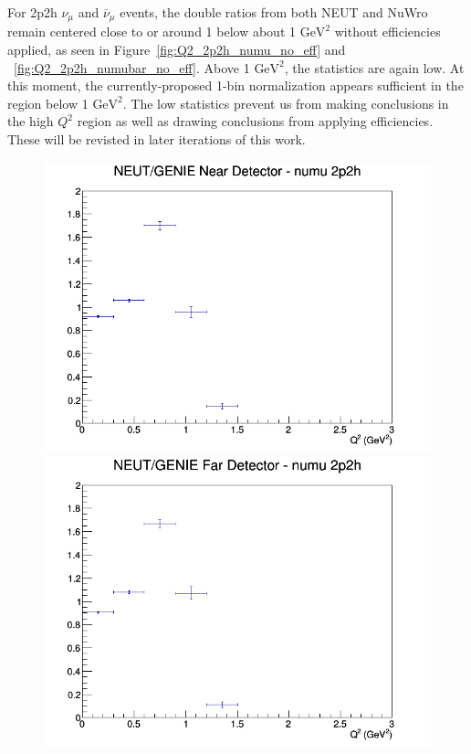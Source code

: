 \documentclass[12pt]{article}
\begin{document}
For 2p2h $\nu_{\mu}$ and $\overline{\nu}_{\mu}$ events, the double ratios from both NEUT and NuWro remain centered close to or around 1 below about 1 $\textrm{GeV}^2$ without efficiencies applied, as seen in Figure~\ref{fig:Q2_2p2h_numu_no_eff} and ~\ref{fig:Q2_2p2h_numubar_no_eff}. Above 1 $\textrm{GeV}^2$, the statistics are again low. At this moment, the currently-proposed 1-bin normalization appears sufficient in the region below 1 $\textrm{GeV}^2$. The low statistics prevent us from making conclusions in the high $Q^2$ region as well as drawing conclusions from applying efficiencies. These will be revisted in later iterations of this work.
\begin{figure}[h]
\includegraphics[width=\linewidth]{Q2/nominal/ratios/2p2h_NEUT_GENIE_numu_near_Q2.png}
\endminipage
{}
\includegraphics[width=\linewidth]{Q2/nominal/ratios/2p2h_NEUT_GENIE_numu_far_Q2.png}

\end{figure}
\end{document}

